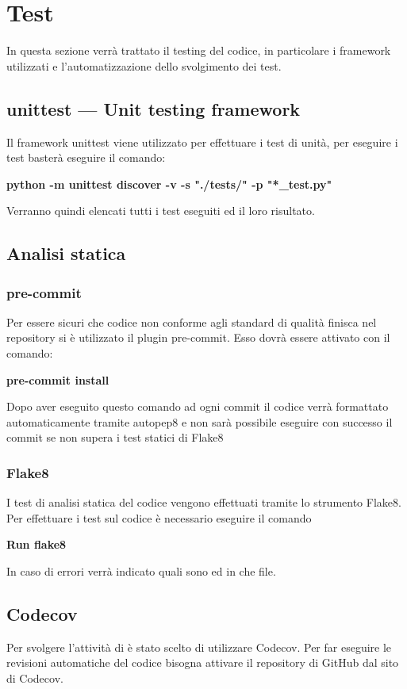 \section{Test}

In questa sezione verrà trattato il testing del codice, in particolare i framework utilizzati e l'automatizzazione dello svolgimento dei test.

\subsection{unittest — Unit testing framework}
Il framework unittest viene utilizzato per effettuare i test di unità, per eseguire i test basterà eseguire il comando: \newline{}
\centerline{ \textbf{python -m unittest discover -v -s "./tests/" -p "*\_test.py"}}\newline{}
Verranno quindi elencati tutti i test eseguiti ed il loro risultato.

\subsection{Analisi statica}
\subsubsection{pre-commit}
Per essere sicuri che codice non conforme agli standard di qualità finisca nel repository si è utilizzato il plugin pre-commit. Esso dovrà essere attivato con il comando: \newline{}
\centerline{\textbf{pre-commit install}}\newline{}
Dopo aver eseguito questo comando ad ogni commit il codice verrà formattato automaticamente tramite autopep8 e non sarà possibile eseguire con successo il commit se non supera i test statici di Flake8
\subsubsection{Flake8}
I test di analisi statica del codice vengono effettuati tramite lo strumento Flake8. Per effettuare i test sul codice è necessario eseguire il comando\newline{}
\centerline{\textbf{Run flake8}}\newline{}
In caso di errori verrà indicato quali sono ed in che file.

\subsection{Codecov}
Per svolgere l'attività di  è stato scelto di utilizzare Codecov. Per far eseguire le revisioni automatiche del codice bisogna attivare il repository di GitHub dal sito di Codecov.

